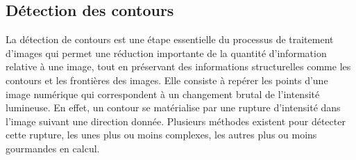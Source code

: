     \subsection{Détection des contours}
    La détection de contours est une étape essentielle du processus de traitement d’images qui permet une réduction importante de la quantité d’information relative à une image, tout en préservant des informations structurelles comme les contours et les frontières des images. Elle consiste à repérer les points d'une image numérique qui correspondent à un
    changement brutal de l'intensité lumineuse. En effet, un contour se matérialise par une rupture d'intensité
    dans l'image suivant une direction donnée. Plusieurs méthodes existent pour détecter cette rupture, les unes plus ou moins complexes, les autres plus ou moins gourmandes en calcul.

